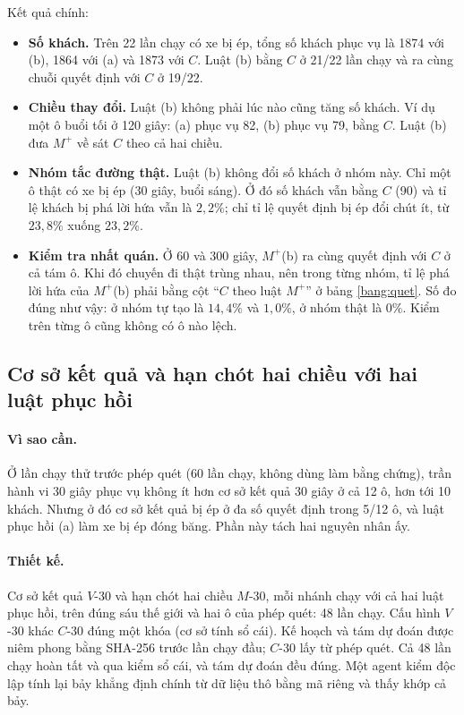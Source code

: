 Kết quả chính:
\begin{itemize}
\item \textbf{Số khách.} Trên 22 lần chạy có xe bị ép, tổng số khách phục vụ là 1874 với (b), 1864 với (a)
và 1873 với $C$. Luật (b) bằng $C$ ở 21/22 lần chạy và ra cùng chuỗi quyết định với $C$ ở 19/22.
\item \textbf{Chiều thay đổi.} Luật (b) không phải lúc nào cũng tăng số khách. Ví dụ một ô buổi tối ở
120 giây: (a) phục vụ 82, (b) phục vụ 79, bằng $C$. Luật (b) đưa $M^{+}$ về sát $C$ theo cả hai chiều.
\item \textbf{Nhóm tắc đường thật.} Luật (b) không đổi số khách ở nhóm này. Chỉ một ô thật có xe bị ép
(30 giây, buổi sáng). Ở đó số khách vẫn bằng $C$ (90) và tỉ lệ khách bị phá lời hứa vẫn là $2{,}2\%$; chỉ
tỉ lệ quyết định bị ép đổi chút ít, từ $23{,}8\%$ xuống $23{,}2\%$.
\item \textbf{Kiểm tra nhất quán.} Ở 60 và 300 giây, $M^{+}$(b) ra cùng quyết định với $C$ ở cả tám ô. Khi
đó chuyến đi thật trùng nhau, nên trong từng nhóm, tỉ lệ phá lời hứa của $M^{+}$(b) phải bằng cột
``$C$ theo luật $M^{+}$'' ở bảng \ref{bang:quet}. Số đo đúng như vậy: ở nhóm tự tạo là $14{,}4\%$ và
$1{,}0\%$, ở nhóm thật là $0\%$. Kiểm trên từng ô cũng không có ô nào lệch.
\end{itemize}

\subsection{Cơ sở kết quả và hạn chót hai chiều với hai luật phục hồi}

\paragraph{Vì sao cần.} Ở lần chạy thử trước phép quét (60 lần chạy, không dùng làm bằng chứng), trần hành vi
30 giây phục vụ không ít hơn cơ sở kết quả 30 giây ở cả 12 ô, hơn tới 10 khách. Nhưng ở đó cơ sở kết quả bị ép ở
đa số quyết định trong 5/12 ô, và luật phục hồi (a) làm xe bị ép đóng băng. Phần này tách hai nguyên nhân ấy.

\paragraph{Thiết kế.} Cơ sở kết quả $V$-30 và hạn chót hai chiều $M$-30, mỗi nhánh chạy với cả hai luật phục hồi,
trên đúng sáu thế giới và hai ô của phép quét: 48 lần chạy. Cấu hình $V$-30 khác $C$-30 đúng một khóa (cơ sở tính
sổ cái). Kế hoạch và tám dự đoán được niêm phong bằng SHA-256 trước lần chạy đầu; $C$-30 lấy từ phép quét. Cả 48 lần
chạy hoàn tất và qua kiểm sổ cái, và tám dự đoán đều đúng. Một agent kiểm độc lập tính lại bảy khẳng định chính từ
dữ liệu thô bằng mã riêng và thấy khớp cả bảy.

